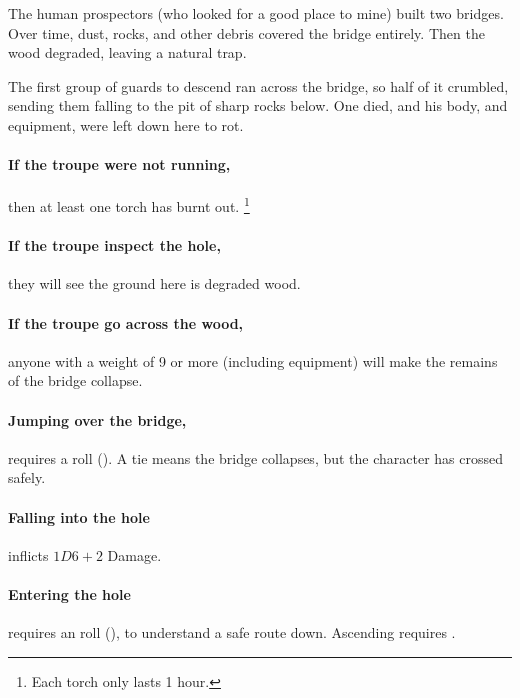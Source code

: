 \begin{multicols}{2}

\begin{exampletext}
  The human prospectors (who looked for a good place to mine) built two bridges.
  Over time, dust, rocks, and other debris covered the bridge entirely.
  Then the wood degraded, leaving a natural trap.

  The first group of \glspl{guard} to descend ran across the bridge, so half of it crumbled, sending them falling to the pit of sharp rocks below.
  One died, and his body, and equipment, were left down here to rot.
\end{exampletext}

\paragraph{If the troupe were not running,}
then at least one torch has burnt out.%
\footnote{Each torch only lasts 1 hour.}

\paragraph{If the troupe inspect the hole,}
they will see the ground here is degraded wood.

\paragraph{If the troupe go across the wood,}
anyone with a \gls{weight} of 9 or more (including equipment) will make the remains of the bridge collapse.

\paragraph{Jumping over the bridge,}
requires a  roll (\tn[9]).
A tie means the bridge collapses, but the character has crossed safely.

\paragraph{Falling into the hole}
inflicts $1D6+2$ Damage.

\paragraph{Entering the hole}
requires an  roll (\tn[10]), to understand a safe route down.
Ascending requires \tn[12].


\end{multicols}
